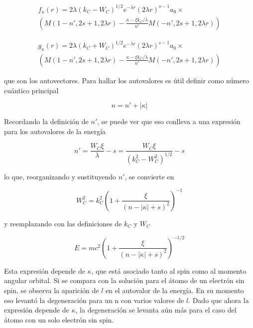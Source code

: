 \documentclass[a4paper, 12pt]{article} %
\begin{document}
\begin{equation}
\begin{split}
f_{\kappa}(r)=2\lambda (k_C -W_C)^{1/2}e^{-\lambda r}(2\lambda r)^{s-1}a_0 \times \\
\left( M(1-n',2s+1,2\lambda r) - \frac{\kappa-\xi k_C /\lambda}{n'} M(-n',2s+1,2\lambda r) \right)
\end{split}
\end{equation}

\begin{equation}
\begin{split}
g_{\kappa}(r)=2\lambda (k_C +W_C)^{1/2}e^{-\lambda r}(2\lambda r)^{s-1}a_0 \times \\
\left( M(1-n',2s+1,2\lambda r) - \frac{\kappa-\xi k_C /\lambda}{n'} M(-n',2s+1,2\lambda r) \right)
\end{split}
\end{equation}

que son los autovectores. Para hallar los autovalores es \'util definir como n\'umero cu\'antico principal 

\begin{equation}
n=n'+|\kappa|
\end{equation}

Recordando la definici\'on de $n'$, se puede ver que eso conlleva a una expresi\'on para los autovalores de la energ\'ia

\begin{equation}
n'= \frac{W_C \xi}{\lambda}-s=\frac{W_C \xi}{(k^2_{C}-W^2_{C})^{1/2}}-s
\end{equation}

lo que, reorganizando y sustituyendo $n'$, se convierte en

\begin{equation}
W^2_C = k^2_C \left(1+\dfrac{\xi}{(n-|\kappa|+s)^2} \right)^{-1}
\end{equation}

y reemplazando con las definiciones de $k_C$ y $W_C$

\begin{equation}\label{eq:enerW}
E = mc^2 \left(1+\dfrac{\xi}{(n-|\kappa|+s)^2} \right)^{-1/2}
\end{equation}

Esta expresi\'on depende de $\kappa$, que est\'a asociado tanto al spin como al momento angular orbital. Si se compara con la soluci\'on para el \'atomo de un electr\'on sin spin, se observa la aparici\'on de $l$ en el autovalor de la energ\'ia. En su momento eso levant\'o la degeneraci\'on para un n con varios valores de $l$. Dado que ahora la expresi\'on depende de $\kappa$, la degeneraci\'on se levanta a\'un m\'as para el caso del \'atomo con un solo electr\'on sin spin.
\end{document}
